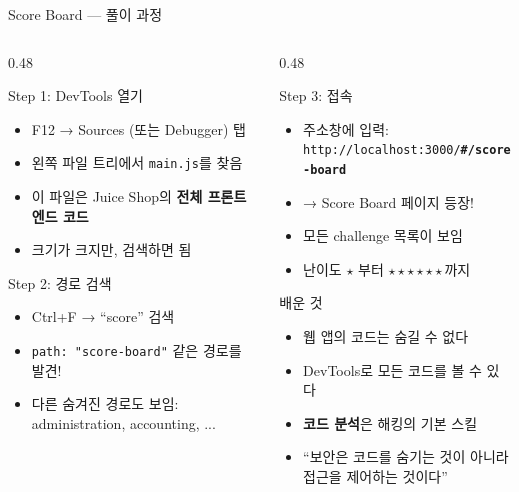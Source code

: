 \documentclass[aspectratio=169,10pt]{beamer}
\newcommand{\hlt}[1]{\textcolor{accent}{\textbf{#1}}}
\newcommand{\red}[1]{\textcolor{redTeam}{\textbf{#1}}}
\begin{document}
\begin{frame}[shrink=15]{Score Board — 풀이 과정}

\begin{columns}[T]
\begin{column}{0.48\textwidth}
\begin{block}{Step 1: DevTools 열기}
\begin{itemize}
    \item F12 → Sources (또는 Debugger) 탭
    \item 왼쪽 파일 트리에서 \texttt{main.js}를 찾음
    \item 이 파일은 Juice Shop의 \hlt{전체 프론트엔드 코드}
    \item 크기가 크지만, 검색하면 됨
\end{itemize}
\end{block}
\vspace{0.3em}
\begin{block}{Step 2: 경로 검색}
\begin{itemize}
    \item Ctrl+F → ``score'' 검색
    \item \texttt{path: "score-board"} 같은 경로를 발견!
    \item 다른 숨겨진 경로도 보임:\\
          {\scriptsize administration, accounting, ...}
\end{itemize}
\end{block}
\end{column}
\begin{column}{0.48\textwidth}
\begin{block}{Step 3: 접속}
\begin{itemize}
    \item 주소창에 입력:\\
          \texttt{http://localhost:3000/\red{\#/score-board}}
    \item → Score Board 페이지 등장!
    \item 모든 challenge 목록이 보임
    \item 난이도 $\star$ 부터 $\star\star\star\star\star\star$까지
\end{itemize}
\end{block}
\vspace{0.3em}
\begin{alertblock}{배운 것}
\begin{itemize}
    \item 웹 앱의 코드는 숨길 수 없다
    \item DevTools로 모든 코드를 볼 수 있다
    \item \hlt{코드 분석}은 해킹의 기본 스킬
    \item ``보안은 코드를 숨기는 것이 아니라\\접근을 제어하는 것이다''
\end{itemize}
\end{alertblock}
\end{column}
\end{columns}
\end{frame}
\end{document}
